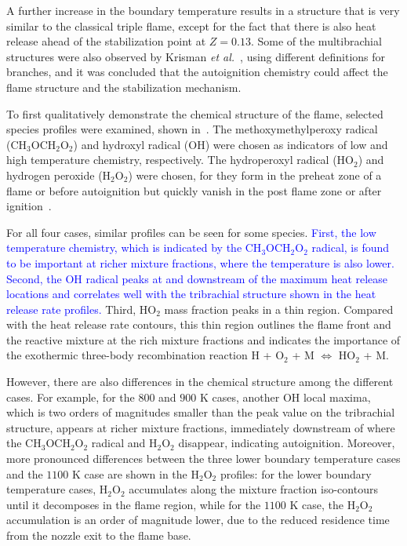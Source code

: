 \documentclass[review,3p,times]{elsarticle}
\begin{document}
A further increase in the boundary temperature results in a structure that is very similar to the classical triple flame, except for the fact that there is also heat release ahead of the stabilization point at $Z = 0.13$.  Some of the multibrachial structures were also observed by Krisman \emph{et al.}~\cite{krisman14}, using different definitions for branches, and it was concluded that the autoignition chemistry could affect the flame structure and the stabilization mechanism.  

To first qualitatively demonstrate the chemical structure of the flame, selected species profiles were examined, shown in~.  The methoxymethylperoxy radical (CH$_3$OCH$_2$O$_2$) and hydroxyl radical (OH) were chosen as indicators of low and high temperature chemistry, respectively.  The hydroperoxyl radical (HO$_2$) and hydrogen peroxide (H$_2$O$_2$) were chosen, for they form in the preheat zone of a flame or before autoignition but quickly vanish in the post flame zone or after ignition~\cite{yoo09}.

For all four cases, similar profiles can be seen for some species.  \textcolor{blue}{First, the low temperature chemistry, which is indicated by the CH$_3$OCH$_2$O$_2$ radical, is found to be important at richer mixture fractions, where the temperature is also lower.  Second, the OH radical peaks at and downstream of the maximum heat release locations and correlates well with the tribrachial structure shown in the heat release rate profiles.}  Third, HO$_2$ mass fraction peaks in a thin region.  Compared with the heat release rate contours, this thin region outlines the flame front and the reactive mixture at the rich mixture fractions and indicates the importance of the exothermic three-body recombination reaction H + O$_2$ + M $\Longleftrightarrow$ HO$_2$ + M.


However, there are also differences in the chemical structure among the different cases.  For example, for the $800$ and $900$ K cases, another OH local maxima, which is two orders of magnitudes smaller than the peak value on the tribrachial structure, appears at richer mixture fractions, immediately downstream of where the CH$_3$OCH$_2$O$_2$ radical and H$_2$O$_2$ disappear, indicating autoignition.  Moreover, more pronounced differences between the three lower boundary temperature cases and the $1100$ K case are shown in the H$_2$O$_2$ profiles: for the lower boundary temperature cases, H$_2$O$_2$ accumulates along the mixture fraction iso-contours  until it decomposes in the flame region, while for the $1100$ K case, the H$_2$O$_2$ accumulation is an order of magnitude lower, due to the reduced residence time from the nozzle exit to the flame base.
  
\end{document}
